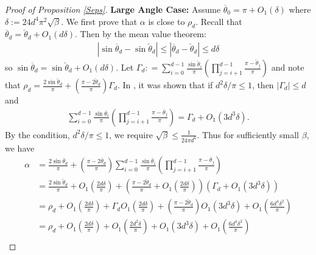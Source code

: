 \documentclass[11pt]{article}
\newcommand{\al}{\alpha}
\theoremstyle{remark}
\begin{document}
\begin{proof}[Proof of Proposition \ref{Seps}]
\textbf{Large Angle Case:} Assume $\overline{\theta}_0 = \pi + O_1(\delta)$ where $\delta := 24d^4\pi^2\sqrt{\beta}.$  We first prove that $\al$ is close to $\rho_d$. Recall that $\overline{\theta}_d = \breve{\theta}_d + O_1(d\delta)$. Then by the mean value theorem: \begin{align*}
|\sin \overline{\theta}_d - \sin \breve{\theta}_d | \leqslant |\overline{\theta}_d - \breve{\theta}_d | \leqslant d \delta
\end{align*} so $\sin \overline{\theta}_d = \sin \breve{\theta}_d + O_1(d\delta)$. Let
$\Gamma_d : = \sum_{i=0}^{d-1} \frac{\sin \breve{\theta}_i}{\pi}\left(\prod_{j=i+1}^{d-1} \frac{\pi - \breve{\theta}_j}{\pi}\right)$ and note that $\rho_d = \frac{2\sin \breve{\theta}_d}{\pi} + \left(\frac{\pi - 2\breve{\theta}_d}{\pi}\right)\Gamma_d.$ In \cite{HV2017}, it was shown that if $d^2\delta /\pi \leqslant 1$, then $|\Gamma_d| \leqslant d$ and 
\begin{align*}
\sum_{i=0}^{d-1} \frac{\sin \overline{\theta}_i}{\pi}\left(\prod_{j=i+1}^{d-1} \frac{\pi - \overline{\theta}_j}{\pi}\right) = \Gamma_d + O_1(3d^3\delta).
\end{align*} By the condition, $d^2\delta /\pi \leqslant 1$, we require $\sqrt{\beta} \leqslant \frac{1}{24\pi d^6}.$
Thus for sufficiently small $\beta$, we have \begin{align*}
\al & = \frac{2\sin \overline{\theta}_d}{\pi} + \left(\frac{\pi - 2\overline{\theta}_d}{\pi}\right) \sum_{i=0}^{d-1} \frac{\sin \overline{\theta}_i}{\pi}\left(\prod_{j=i+1}^{d-1} \frac{\pi - \overline{\theta}_j}{\pi}\right) \\
& = \frac{2\sin \breve{\theta}_d}{\pi} + O_1\left(\frac{2d\delta}{\pi}\right) + \left(\frac{\pi - 2 \breve{\theta}_d}{\pi} + O_1 \left(\frac{2d\delta}{\pi}\right)\right)\left(\Gamma_d + O_1(3d^3 \delta)\right) \\
& = \rho_d + O_1\left(\frac{2d\delta}{\pi}\right) + \Gamma_d O_1\left(\frac{2d\delta}{\pi}\right) + \left(\frac{\pi - 2\breve{\theta}_d}{\pi}\right)O_1\left(3d^3\delta\right) + O_1 \left(\frac{6d^4\delta^2}{\pi}\right) \\
& = \rho_d + O_1\left(\frac{2d\delta}{\pi}\right) + O_1\left(\frac{2d^2\delta}{\pi}\right)+ O_1\left(3d^3\delta\right) + O_1\left(\frac{6d^4\delta^2}{\pi}\right) \\

\end{align*}
\end{proof}
\end{document}
